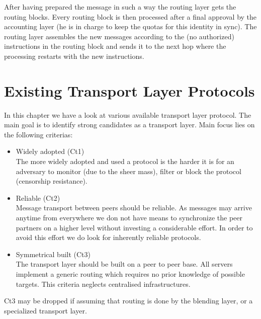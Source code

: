 After having prepared the message in such a way the routing layer gets the routing blocks. Every routing block is then processed after a final approval by the accounting layer (he is in charge to keep the quotas for this identity in  sync). The routing layer assembles the new messages according to the (no authorized) instructions in the routing block and sends it to the next hop where the processing restarts with the new instructions. 

\chapter{Existing Transport Layer Protocols \label{sec:existingTPP}}
In this chapter we have a look at various available transport layer protocol. The main goal is to identify strong candidates as a transport layer. Main focus lies on the following criterias:
\begin{itemize}
	\item Widely adopted (Ct1)\\
	The more widely adopted and used a protocol is the harder it is for an adversary to monitor (due to the sheer mass), filter or block the protocol (censorship resistance).
	\item Reliable (Ct2)\\
	Message transport between peers should be reliable. As messages may arrive anytime from everywhere we don not have means to synchronize the peer partners on a higher level without investing a considerable effort. In order to avoid this effort we do look for inherently reliable protocols.
	\item Symmetrical built (Ct3)\\
	The transport layer should be built on a peer to peer base. All servers implement a generic routing which requires no prior knowledge of possible targets. This criteria neglects centralised infrastructures.
\end{itemize}

Ct3 may be dropped if assuming that routing is done by the blending layer, or a specialized transport layer.



